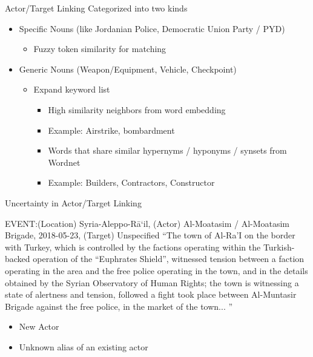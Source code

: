 \begin{frame}{Actor/Target Linking}
Categorized into two kinds
    \begin{itemize}
        \item Specific Nouns (like Jordanian Police, Democratic Union Party / PYD)
        \begin{itemize}
            \item Fuzzy token similarity for matching
        \end{itemize}
        \item Generic Nouns (Weapon/Equipment, Vehicle, Checkpoint)
        \begin{itemize}
            \item Expand keyword list
            \begin{itemize}
                \item High similarity neighbors from word embedding
                \item Example: Airstrike, bombardment
                \item Words that share similar hypernyms / hyponyms / synsets from Wordnet 
                \item Example: Builders, Contractors, Constructor
            \end{itemize}
        \end{itemize}
    \end{itemize}
\end{frame}

\begin{frame}{Uncertainty in Actor/Target Linking}
\begin{block}{EVENT:(Location) Syria-Aleppo-Rā‘il,  (Actor) Al-Moatasim / Al-Moatasim Brigade,  2018-05-23,  (Target) Unspecified}
\small
``The town of Al-Ra’I on the border with Turkey, which is controlled by the factions operating within the Turkish-backed operation of the “Euphrates Shield”, witnessed tension between a faction operating in the area and the free police operating in the town, and in the details obtained by the Syrian Observatory of Human Rights; the town is witnessing a state of alertness and tension, followed a fight took place between \alert{Al-Muntasir Brigade} against the free police, in the market of the town... ''
\end{block}

\begin{itemize}
    \item New Actor
    \item Unknown alias of an existing actor
\end{itemize}

\end{frame}

